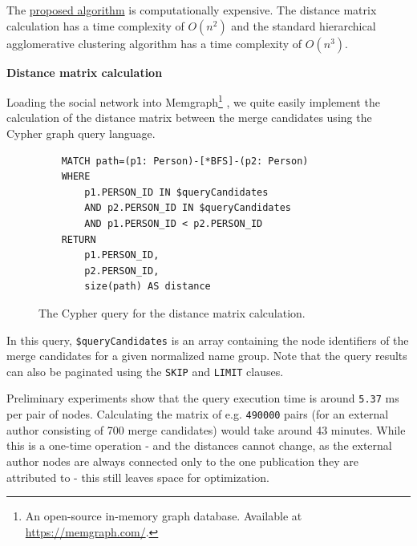 The \hyperref[sec:distance-based-hierarchical-clustering]{proposed algorithm} 
is computationally expensive. The distance matrix calculation has a time complexity of $O(n^2)$
and the standard hierarchical agglomerative clustering algorithm has a time complexity of $O(n^3)$.

\textbf{Distance matrix calculation}

Loading the social network into Memgraph\footnote{An open-source in-memory graph database. Available at \url{https://memgraph.com/}.}
, we quite easily implement the calculation of the distance matrix between the merge candidates using the Cypher graph query language.

\begin{figure}[!ht]
\begin{verbatim}
    MATCH path=(p1: Person)-[*BFS]-(p2: Person)
    WHERE 
        p1.PERSON_ID IN $queryCandidates 
        AND p2.PERSON_ID IN $queryCandidates
        AND p1.PERSON_ID < p2.PERSON_ID
    RETURN 
        p1.PERSON_ID, 
        p2.PERSON_ID, 
        size(path) AS distance
\end{verbatim}
\captionsetup{width=.9\linewidth}
\caption{The Cypher query for the distance matrix calculation.\protect\footnotemark}
\label{fig:distance-matrix-calculation}
\end{figure}


In this query, \texttt{\$queryCandidates} is an array containing the node identifiers of the merge candidates for a given normalized name group.
Note that the query results can also be paginated using the \texttt{SKIP} and \texttt{LIMIT} clauses.

Preliminary experiments show that the query execution time is around \texttt{5.37} ms per pair of nodes.
Calculating the matrix of e.g. \texttt{490000} pairs (for an external author consisting of 700 merge candidates) would take around 43 minutes.
While this is a one-time operation - and the distances cannot change, as the external author nodes are always connected only to the one publication they are attributed to - this still leaves space for optimization.

